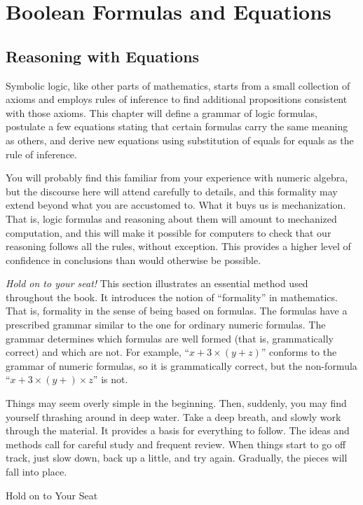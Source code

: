 \chapter{Boolean Formulas and Equations}
\label{ch:Boolean-Formulas}

\section{Reasoning with Equations}
\label{sec:math-and-equations}
Symbolic logic,
like other parts of mathematics, starts from a small
collection of axioms and employs rules of inference to find
additional propositions consistent with those axioms. This
chapter will define a grammar of logic formulas, postulate a few
equations stating that certain formulas carry the same meaning as others,
and derive new equations
using substitution of equals for equals as the rule of
inference.

You will probably find this familiar from your
experience with numeric algebra, but the discourse here will attend carefully
to details, and this formality may extend beyond what you are
accustomed to. What it buys us is mechanization. That is,
logic formulas and reasoning about them will amount to
mechanized computation, and this will make it possible for
computers to check that our reasoning follows all the rules,
without exception. This provides a higher level of confidence
in conclusions than would otherwise be possible.

\begin{aside}
\emph{Hold on to your seat!}
This
section illustrates an essential method used throughout the book.
It introduces the notion of ``formality'' in mathematics.
That is, formality in the sense of being based on formulas.
The formulas have a prescribed grammar similar to the one
for ordinary numeric formulas.
The grammar determines which formulas are well formed
(that is, grammatically correct) and which are not.
For example, ``$x+3\times(y + z)$'' conforms to the grammar
of numeric formulas,
so it is grammatically correct,
but the non-formula ``$x+3\times(y + ) \times z$'' is not.

Things may seem overly simple in the beginning.
Then, suddenly, you may find yourself thrashing around in deep water.
Take a deep breath, and slowly work  through the material.
It provides a basis for everything to follow.
The ideas and methods call for careful study and frequent review.
When things start to go off track,
just slow down, back up a little, and try
again.
Gradually, the pieces will fall into place.
\caption{Hold on to Your Seat}
\label{aside-hold-on-to-seat}
\end{aside}


